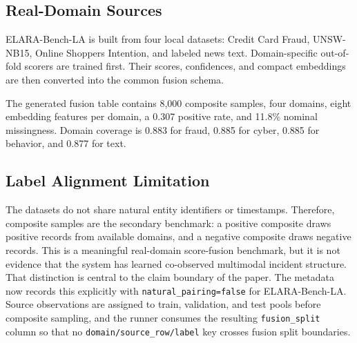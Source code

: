 \documentclass[10pt,conference]{IEEEtran}
\newcommand{\benchmark}{ELARA-Bench-LA}
\begin{document}

\subsection{Real-Domain Sources}
\benchmark{} is built from four local datasets: Credit Card Fraud, UNSW-NB15,
Online Shoppers Intention, and labeled news text. Domain-specific out-of-fold
scorers are trained first. Their scores, confidences, and compact embeddings are
then converted into the common fusion schema.

\begin{table}[t]
\centering
\caption{Out-of-fold domain scorer quality used to construct \benchmark.}
\label{tab:domain-scorers}
\footnotesize

\end{table}

The generated fusion table contains 8,000 composite samples, four domains,
eight embedding features per domain, a 0.307 positive rate, and 11.8\% nominal
missingness. Domain coverage is 0.883 for fraud, 0.885 for cyber, 0.885 for
behavior, and 0.877 for text.

\subsection{Label Alignment Limitation}
The datasets do not share natural entity identifiers or timestamps. Therefore,
composite samples are the secondary benchmark: a positive composite draws positive
records from available domains, and a negative composite draws negative records.
This is a meaningful real-domain score-fusion benchmark, but it is not evidence
that the system has learned co-observed multimodal incident structure. That
distinction is central to the claim boundary of the paper. The metadata now
records this explicitly with \texttt{natural\_pairing=false} for \benchmark{}.
Source observations are assigned to train, validation, and test pools before
composite sampling, and the runner consumes the resulting
\texttt{fusion\_split} column so that no \texttt{domain/source\_row/label} key
crosses fusion split boundaries.
\end{document}
